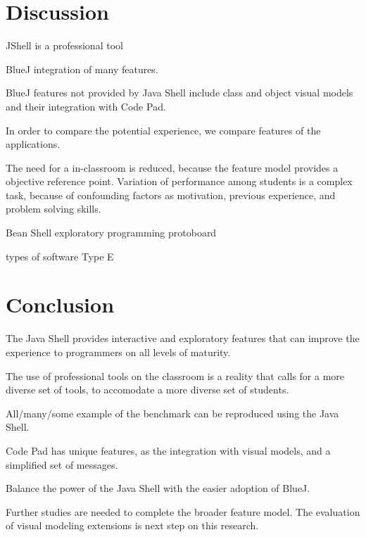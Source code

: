\documentclass{article}
\begin{document}
\section{Discussion}

JShell is a professional tool

BlueJ integration of many features.

BlueJ features not provided by Java Shell include class and object visual models and their integration with Code Pad.

In order to compare the potential experience, we compare features of the applications.

The need for a in-classroom is reduced, because the feature model provides a objective reference point. Variation of performance among students is a complex task, because of confounding factors as motivation, previous experience, and problem solving skills.

Bean Shell exploratory programming
protoboard

types of software 
Type E


\section{Conclusion}

The Java Shell provides interactive and exploratory features that can improve the experience to programmers on all levels of maturity.

The use of professional tools on the classroom is a reality that calls for a more diverse set of tools, to accomodate a more diverse set of students.

All/many/some example of the benchmark can be reproduced using the Java Shell.

Code Pad has unique features, as the integration with visual models, and a simplified set of messages. 


Balance the power of the Java Shell with the easier adoption of BlueJ.

Further studies are needed to complete the broader feature model. The evaluation of visual modeling extensions is next step on this research.




\end{document}
